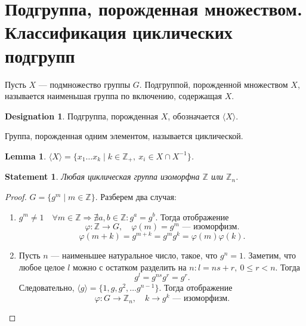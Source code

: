 \documentclass[11pt]{book}
\newcommand{\Z}{\mathbb{Z}}
\renewcommand{\le}{\leqslant}
\theoremstyle{definition}
\theoremstyle{plain}
\theoremstyle{plain}
\newtheorem{lm}{Lemma}
\newtheorem{st}{Statement}
\theoremstyle{definition}
\newtheorem*{name}{Designation}
\theoremstyle{remark}
\begin{document}
\section{Подгруппа, порожденная множеством. Классификация циклических подгрупп}
\begin{defn}
    Пусть $ X$ --- подмножество группы  $ G$.  {\sf Подгруппой, порожденной множеством}  $ X$, называется наименьшая группа по включению, содержащая  $ X$.
    \begin{name}
	Подгруппа, порожденная  $ X$, обозначается $ \langle X \rangle$.
    \end{name}
\end{defn}
\begin{defn}
    Группа, порожденная одним элементом, называется {\sf циклической}.
\end{defn}
\begin{lm}
    $ \langle X \rangle = \{x_1 \ldots x_k \mid k \in \Z_+, ~ x_i \in X \cap X^{-1}\}$.
\end{lm}
\begin{st}
    Любая циклическая группа изоморфна $\Z$ или $\Z_n$.
\end{st}
\begin{proof}
    $G = \{g^m \mid m \in \Z\}$. Разберем два случая:
    \begin{enumerate}
	\item $g^m \ne 1 \quad  \forall m \in  \Z \Longrightarrow \nexists a, b \in \Z: g^{a} = g^{b}$.
	    Тогда отображение
	    \[
		\varphi : \Z \to  G, \quad \varphi (m) = g^m
	    \text{ --- изоморфизм}.\]
	    \[
		\varphi (m+k) = g^{m+k} = g^m g^k = \varphi (m) \varphi (k)
	    .\]
	\item Пусть $n$ --- наименьшее натуральное число, такое, что $g^n = 1$.
	    Заметим, что любое целое $ l$ можно с остатком разделить на  $ n: l = ns + r, ~ 0 \le r < n$.
	    Тогда \[
		g^{l} = g^{ns}g^{r} = g^{r}
	    .\]
	    Следовательно, $ \langle g \rangle = \{1, g, g^2, \ldots g^{n-1}\}$.
	    Тогда отображение
	    \[
		\varphi : G \to \Z_n, \quad k \to  g^{k} \text{ --- изоморфизм}
	    .\]
    \end{enumerate}
\end{proof}
\end{document}
